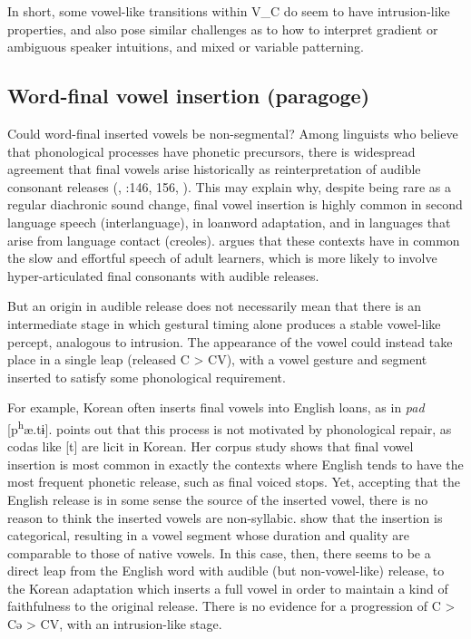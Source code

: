 \documentclass[output=paper,colorlinks,citecolor=brown]{langscibook}
\begin{document}
In short, some vowel-like transitions within V\_C do seem to have intrusion-like properties, and also pose similar challenges as to how to interpret gradient or ambiguous speaker intuitions, and mixed or variable patterning.  

\subsection{Word-final vowel insertion (paragoge)}
\largerpage
Could word-final inserted vowels be non-segmental? Among linguists who believe that phonological processes have phonetic precursors, there is widespread agreement that final vowels arise historically as reinterpretation of audible consonant releases (\cite{kang2003perceptual}, \citealt{blevins04}:146, 156, \citealt{ng2013paragoge}). This may explain why, despite being rare as a regular diachronic sound change, final vowel insertion is highly common in second language speech (interlanguage), in loanword adaptation, and in languages that arise from language contact (creoles). \citet{ng2013paragoge} argues that these contexts have in common the slow and effortful speech of adult learners, which is more likely to involve hyper-articulated final consonants with audible releases.

But an origin in audible release does not necessarily mean that there is an intermediate stage in which gestural timing alone produces a stable vowel-like percept, analogous to intrusion. The appearance of the vowel could instead take place in a single leap (released C > CV), with a vowel gesture and segment inserted to satisfy some phonological requirement. 

For example, Korean often inserts final vowels into English loans, as in \textit{pad} [p\textsuperscript{h}æ.tɨ]. \citet{kang2003perceptual} points out that this process is not motivated by phonological repair, as codas like [t] are licit in Korean. Her corpus study shows that final vowel insertion is most common in exactly the contexts where English tends to have the most frequent phonetic release, such as final voiced stops. Yet, accepting that the English release is in some sense the source of the inserted vowel, there is no reason to think the inserted vowels are non-syllabic. \citet{kim2011phonology} show that the insertion is categorical, resulting in a vowel segment whose duration and quality are comparable to those of native vowels. In this case, then, there seems to be a direct leap from the English word with audible (but non-vowel-like) release, to the Korean adaptation which inserts a full vowel in order to maintain a kind of faithfulness to the original release. There is no evidence for a progression of C > Cə > CV, with an intrusion-like stage. 
\end{document}
